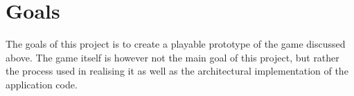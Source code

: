 \section{Goals}
The goals of this project is to create a playable prototype of the game discussed above. The game itself is however not the main goal of this project, but rather the process used in realising it as well as the architectural implementation of the application code.
